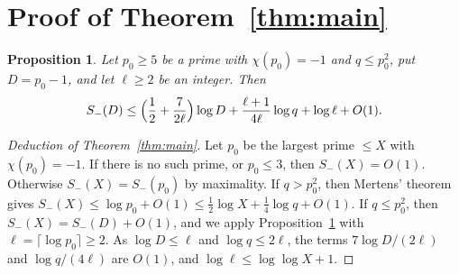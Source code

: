\documentclass[11pt]{amsart}
\newtheorem{proposition}[theorem]{Proposition}
\theoremstyle{remark}
\begin{document}
\section{Proof of Theorem~\ref{thm:main}}\label{sec:main}

\begin{proposition}\label{prop:ell}
Let $p_0\ge5$ be a prime with $\chi(p_0)=-1$ and $q\le p_0^2$, put $D=p_0-1$, and let $\ell\ge2$ be
an integer. Then
\[
S_-(D)\le\Bigl(\frac12+\frac{7}{2\ell}\Bigr)\log D+\frac{\ell+1}{4\ell}\log q+\log\ell+O(1).
\]
\end{proposition}

\begin{proof}[Deduction of Theorem~\ref{thm:main}]
Let $p_0$ be the largest prime $\le X$ with $\chi(p_0)=-1$. If there is no such prime, or $p_0\le3$,
then $S_-(X)=O(1)$. Otherwise $S_-(X)=S_-(p_0)$ by maximality. If $q>p_0^2$, then Mertens' theorem gives
$S_-(X)\le\log p_0+O(1)\le\frac12\log X+\frac14\log q+O(1)$. If $q\le p_0^2$, then $S_-(X)=S_-(D)+O(1)$, and we apply
Proposition~\ref{prop:ell} with $\ell=\lceil\log p_0\rceil\ge2$. As $\log D\le\ell$ and
$\log q\le2\ell$, the terms $7\log D/(2\ell)$ and $\log q/(4\ell)$ are $O(1)$, and
$\log\ell\le\log\log X+1$.
\end{proof}
\end{document}
